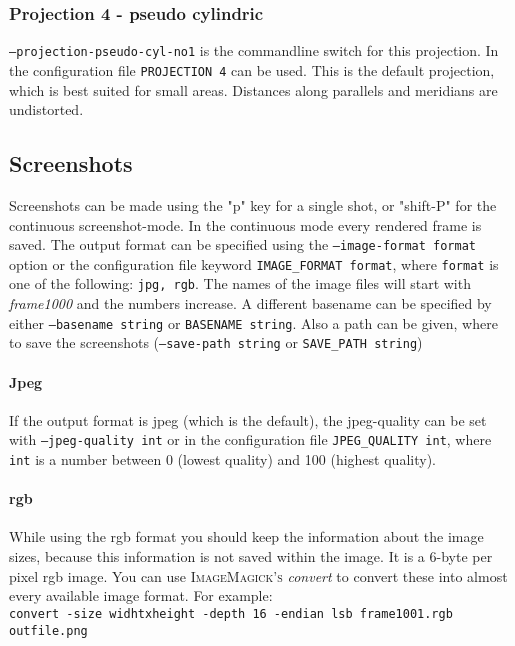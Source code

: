\subsubsection{Projection 4 - pseudo cylindric}
\texttt{--projection-pseudo-cyl-no1} is the commandline switch for this projection. In the configuration file \texttt{PROJECTION 4} can be used. This is the default projection, which is best suited for small areas. Distances along parallels and meridians are undistorted.



\subsection{Screenshots}
\label{screenshots}
Screenshots can be made using the "p" key for a single shot, or "shift-P" for the continuous screenshot-mode. In the continuous mode every rendered frame is saved. The output format can be specified using the \texttt{--image-format format} option or the configuration file keyword \texttt{IMAGE\_FORMAT format}, where \texttt{format} is one of the following: \texttt{jpg, rgb}.
The names of the image files will start with \emph{frame1000} and the numbers increase.
A different basename can be specified by either \texttt{--basename string} or \texttt{BASENAME string}. Also a path can be given, where to save the screenshots (\texttt{--save-path string} or \texttt{SAVE\_PATH string})

\paragraph{Jpeg}
If the output format is jpeg (which is the default), the jpeg-quality can be set with \texttt{--jpeg-quality int} or in the configuration file \texttt{JPEG\_QUALITY int}, where \texttt{int} is a number between 0 (lowest quality) and 100 (highest quality).

\paragraph{rgb}
While using the rgb format you should keep the information about the image sizes, because this information is not saved within the image. It is a 6-byte per pixel rgb image. You can use \textsc{ImageMagick's} \emph{convert} to convert these into almost every available image format. For example:\\
\texttt{convert -size widhtxheight -depth 16 -endian lsb frame1001.rgb outfile.png}



